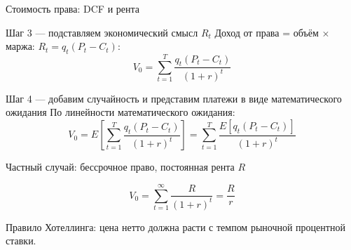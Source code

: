 \documentclass[10pt]{beamer}
\begin{document}
\begin{frame}{Стоимость права: DCF и рента}
\footnotesize
\begin{block}{Шаг 3 --- подставляем экономический смысл $R_t$}
Доход от права = объём $\times$ маржа: $R_t=q_t(P_t-C_t)$:
\[ V_0=\sum_{t=1}^{T}\dfrac{q_t(P_t-C_t)}{(1+r)^t} \]
\end{block}

\begin{block}{Шаг 4 --- добавим случайность и представим платежи в виде математического ожидания}
По линейности математического ожидания:
\[ V_0=E\left[ \sum_{t=1}^{T}\dfrac{q_t(P_t-C_t)}{(1+r)^t}\right] = \sum_{t=1}^{T}\dfrac{ E \left[ q_t(P_t-C_t)\right] }{(1+r)^t} \]
\end{block}

\begin{alertblock}{Частный случай: бессрочное право, постоянная рента $R$}
\noindent
\begin{minipage}[t]{0.35\textwidth} %
\vspace{0pt} %
$$ V_0 = \sum_{t=1}^{\infty}\frac{R}{(1+r)^t} = \frac{R}{r} $$
\end{minipage}%
\hfill%
\begin{minipage}[t]{0.6\textwidth} %

\vspace{0pt} Правило Хотеллинга: цена нетто должна расти с темпом рыночной процентной ставки.
\end{minipage}
\end{alertblock}

\end{frame}
\end{document}
